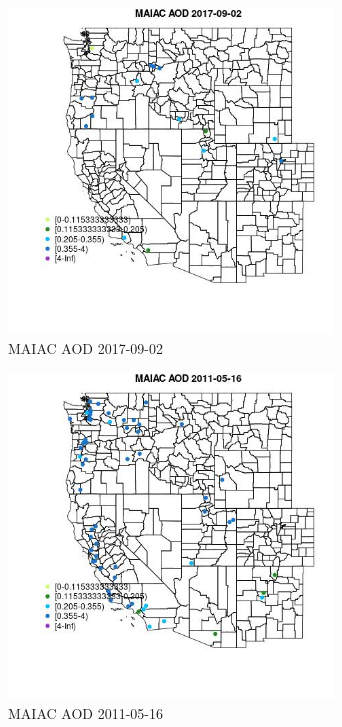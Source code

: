 \begin{figure} 
\centering  
\includegraphics[width=0.77\textwidth]{Code_Outputs/Report_ML_input_PM25_Step4_part_e_de_duplicated_aveswNAs_MapObsMAIAC_AOD2017-09-02.jpg} 
\caption{\label{fig:Report_ML_input_PM25_Step4_part_e_de_duplicated_aveswNAsMapObsMAIAC_AOD2017-09-02}MAIAC AOD 2017-09-02} 
\end{figure} 
 

\clearpage 

\begin{figure} 
\centering  
\includegraphics[width=0.77\textwidth]{Code_Outputs/Report_ML_input_PM25_Step4_part_e_de_duplicated_aveswNAs_MapObsMAIAC_AOD2011-05-16.jpg} 
\caption{\label{fig:Report_ML_input_PM25_Step4_part_e_de_duplicated_aveswNAsMapObsMAIAC_AOD2011-05-16}MAIAC AOD 2011-05-16} 
\end{figure} 
 

